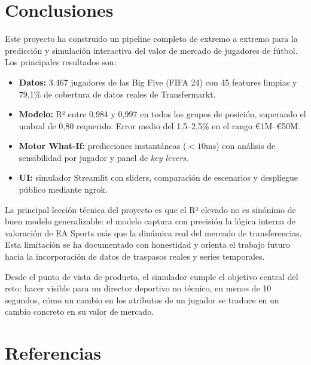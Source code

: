 \documentclass[12pt,a4paper]{report}
\begin{document}
\chapter{Conclusiones}

Este proyecto ha construido un pipeline completo de extremo a extremo para la predicción y simulación interactiva del valor de mercado de jugadores de fútbol. Los principales resultados son:

\begin{successbox}
\begin{itemize}
  \item \textbf{Datos:} 3.467 jugadores de las Big Five (FIFA 24) con 45 features limpias y 79{,}1\% de cobertura de datos reales de Transfermarkt.
  \item \textbf{Modelo:} R² entre 0{,}984 y 0{,}997 en todos los grupos de posición, superando el umbral de 0{,}80 requerido. Error medio del 1{,}5--2{,}5\% en el rango €1M--€50M.
  \item \textbf{Motor What-If:} predicciones instantáneas ($< 10$ms) con análisis de sensibilidad por jugador y panel de \textit{key levers}.
  \item \textbf{UI:} simulador Streamlit con sliders, comparación de escenarios y despliegue público mediante ngrok.
\end{itemize}
\end{successbox}

La principal lección técnica del proyecto es que el R² elevado no es sinónimo de buen modelo generalizable: el modelo captura con precisión la lógica interna de valoración de EA Sports más que la dinámica real del mercado de transferencias. Esta limitación se ha documentado con honestidad y orienta el trabajo futuro hacia la incorporación de datos de traspasos reales y series temporales.

Desde el punto de vista de producto, el simulador cumple el objetivo central del reto: hacer visible para un director deportivo no técnico, en menos de 10 segundos, cómo un cambio en los atributos de un jugador se traduce en un cambio concreto en su valor de mercado.

\chapter*{Referencias}
\end{document}
